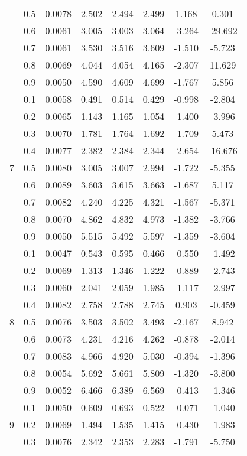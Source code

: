 \documentclass[11pt,a4paper]{report}
\begin{document}
\begin{longtable}{ | c | c || c | c | c | c | c | c | }
 & 0.5 & 0.0078 & 2.502 & 2.494 & 2.499 & 1.168 & 0.301 \\
 & 0.6 & 0.0061 & 3.005 & 3.003 & 3.064 & -3.264 & -29.692 \\
 & 0.7 & 0.0061 & 3.530 & 3.516 & 3.609 & -1.510 & -5.723 \\
 & 0.8 & 0.0069 & 4.044 & 4.054 & 4.165 & -2.307 & 11.629 \\
 & 0.9 & 0.0050 & 4.590 & 4.609 & 4.699 & -1.767 & 5.856 \\
 \hline
\multirow{9}{*}{7} & 0.1 & 0.0058 & 0.491 & 0.514 & 0.429 & -0.998 & -2.804 \\
 & 0.2 & 0.0065 & 1.143 & 1.165 & 1.054 & -1.400 & -3.996 \\
 & 0.3 & 0.0070 & 1.781 & 1.764 & 1.692 & -1.709 & 5.473 \\
 & 0.4 & 0.0077 & 2.382 & 2.384 & 2.344 & -2.654 & -16.676 \\
 & 0.5 & 0.0080 & 3.005 & 3.007 & 2.994 & -1.722 & -5.355 \\
 & 0.6 & 0.0089 & 3.603 & 3.615 & 3.663 & -1.687 & 5.117 \\
 & 0.7 & 0.0082 & 4.240 & 4.225 & 4.321 & -1.567 & -5.371 \\
 & 0.8 & 0.0070 & 4.862 & 4.832 & 4.973 & -1.382 & -3.766 \\
 & 0.9 & 0.0050 & 5.515 & 5.492 & 5.597 & -1.359 & -3.604 \\
 \hline
\multirow{9}{*}{8} & 0.1 & 0.0047 & 0.543 & 0.595 & 0.466 & -0.550 & -1.492 \\
 & 0.2 & 0.0069 & 1.313 & 1.346 & 1.222 & -0.889 & -2.743 \\
 & 0.3 & 0.0060 & 2.041 & 2.059 & 1.985 & -1.117 & -2.997 \\
 & 0.4 & 0.0082 & 2.758 & 2.788 & 2.745 & 0.903 & -0.459 \\
 & 0.5 & 0.0076 & 3.503 & 3.502 & 3.493 & -2.167 & 8.942 \\
 & 0.6 & 0.0073 & 4.231 & 4.216 & 4.262 & -0.878 & -2.014 \\
 & 0.7 & 0.0083 & 4.966 & 4.920 & 5.030 & -0.394 & -1.396 \\
 & 0.8 & 0.0054 & 5.692 & 5.661 & 5.809 & -1.320 & -3.800 \\
 & 0.9 & 0.0052 & 6.466 & 6.389 & 6.569 & -0.413 & -1.346 \\
 \hline
\multirow{9}{*}{9} & 0.1 & 0.0050 & 0.609 & 0.693 & 0.522 & -0.071 & -1.040 \\
 & 0.2 & 0.0069 & 1.494 & 1.535 & 1.415 & -0.430 & -1.983 \\
 & 0.3 & 0.0076 & 2.342 & 2.353 & 2.283 & -1.791 & -5.750 \\

\end{longtable}
\end{document}
